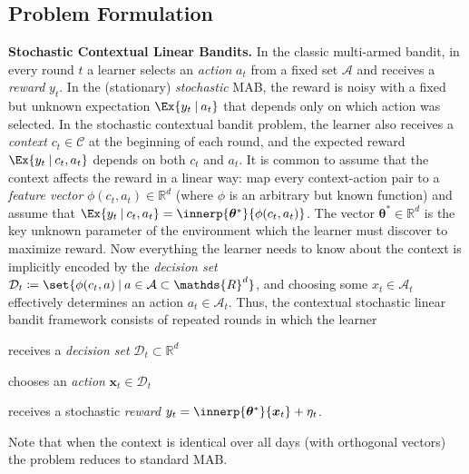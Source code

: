 \documentclass{article}
\renewcommand{\vec}[1]{\bm{#1}}
\newcommand{\defeq}{\coloneq}
\newcommand{\Real}{\mathds{R}}
\newcommand\given[1][\delimsize]{%
  \providecommand{\delimsize}{}
  \nonscript\:#1\vert\allowbreak\nonscript\:\mathopen{}
}
\newcommand{\A}{\mathcal{A}}
\newcommand{\C}{\mathcal{C}}
\newcommand{\D}{\mathcal{D}}
\renewcommand{\paragraph}[1]{\vspace{2pt}\noindent\textbf{#1}}
\begin{document}
\subsection{Problem Formulation}
\label{subsec:problem_formulation}
\paragraph{Stochastic Contextual Linear Bandits.}%
In the classic multi-armed bandit, in every round $t$ a learner
selects an \emph{action} $a_t$ from a fixed set $\A$ and receives a
\emph{reward} $y_t$.  In the (stationary) \emph{stochastic} MAB, the
reward is noisy with a fixed but unknown expectation
$\Ex{y_t\given a_t}$ that depends only on which action was selected.
In the stochastic contextual bandit problem, the learner also receives
a \emph{context} $c_t\in\C$ at the beginning of each round, and the
expected reward $\Ex{y_t\given c_t,a_t}$ depends on both $c_t$ and
$a_t$.  It is common to assume that the context
affects the reward in a linear way: map every context-action pair to a
\emph{feature vector} $\phi(c_t,a_t)\in\Real^d$ (where $\phi$ is an
arbitrary but known function) and assume that
$\Ex{y_t\given c_t,a_t} = \innerp{\vec\theta^*}{\phi(c_t,a_t)}$.  The
vector $\vec\theta^*\in\Real^d$ is the key unknown parameter of the
environment which the learner must discover to maximize reward.  Now
everything the learner needs to know about the context is implicitly
encoded by the \emph{decision set}
$\D_t \defeq \set{\phi(c_t,a)\given a\in\A \subset \Real^d}$, and
choosing some $x_t\in\A_t$ effectively determines an action
$a_t\in\A_t$.  Thus, the contextual stochastic linear bandit framework
consists of repeated rounds in which the learner
\begin{enumerate*}[(i),before=\unskip{: },itemjoin={{; }},itemjoin*={{; and }}]
\item receives a \emph{decision set} $\mathcal{D}_t \subset \Real^d$
\item chooses an \emph{action} $\vec x_t \in \mathcal{D}_t$
\item receives a stochastic \emph{reward}
  $y_t = \innerp{\vec\theta^*}{\vec x_t} + \eta_t$.
\end{enumerate*}
Note that when the context is identical over all days (with orthogonal vectors) the problem reduces to standard MAB.
\end{document}
